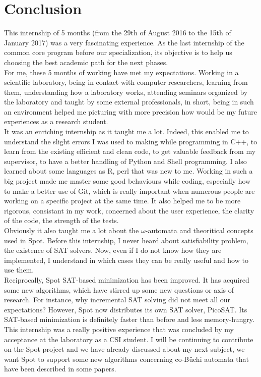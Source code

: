 \chapter{Conclusion}
This internship of 5 months (from the 29th of August 2016 to the 15th of January 2017) was a very
fascinating experience. As the last internship of the common core program before our specialization, its
objective is to help us choosing the best academic path for the next phases.\\

For me, these 5 months of working have met my expectations. Working in a scientific laboratory,
being in contact with computer researchers, learning from them, understanding how a laboratory works,
attending seminars organized by the laboratory and taught by some external professionals, in short, being
in such an environment helped me picturing with more precision how would be my future experiences as
a research student.\\

It was an enriching internship as it taught me a lot. Indeed, this enabled me to understand the slight
errors I was used to making while programming in C++, to learn from the existing efficient and clean code,
to get valuable feedback from my supervisor, to have a better handling of Python and Shell programming.
I also learned about some languages as R, perl that was new to me. Working in such a big project made me
master some good behaviours while coding, especially how to make a better use of Git, which is really
important when numerous people are working on a specific project at the same time. It also helped me to be
more rigorous, consistant in my work, concerned about the user experience, the clarity of the code, the strength of
the tests.\\

Obviously it also taught me a lot about the $\omega$-automata and theoritical concepts used in Spot.
Before this internship, I never heard about satisfiability problem, the existence of SAT solvers. Now,
even if I do not know how they are implemented, I understand in which cases they can be really useful and
how to use them.\\

Reciprocally, Spot SAT-based minimization has been improved. It has acquired some new algorithms, which
have stirred up some new questions or axis of research. For instance, why incremental SAT solving did not
meet all our expectations? However, Spot now distributes its own SAT solver, PicoSAT. Its SAT-based
minimization is definitely faster than before and less memory-hungry.\\

This internship was a really positive experience that was concluded by my acceptance at the laboratory
as a CSI student. I will be continuing to contribute on the Spot project and we have already discussed about my
next subject, we want Spot to support some new algorithms concerning co-Büchi automata that have been
described in some papers.
